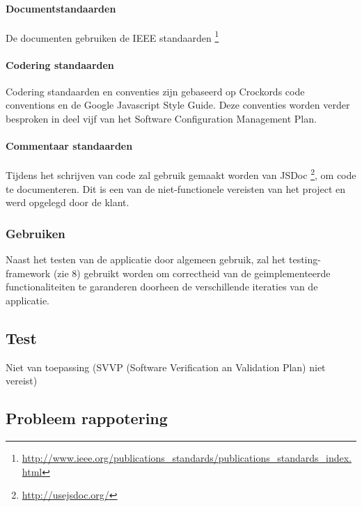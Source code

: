 \paragraph {Documentstandaarden}
De documenten gebruiken de IEEE standaarden \footnote{\url{http://www.ieee.org/publications_standards/publications_standards_index.html}}

\paragraph{Codering standaarden}

Codering standaarden en conventies zijn gebaseerd op Crockords code conventions en de Google Javascript Style Guide. Deze conventies worden verder besproken in deel vijf van het Software Configuration Management Plan.

\paragraph{Commentaar standaarden}

Tijdens het schrijven van code zal gebruik gemaakt worden van JSDoc \footnote{\url{http://usejsdoc.org/}}, om code te documenteren. Dit is een van de niet-functionele vereisten van het project en werd opgelegd door de klant.

\subsubsection{Gebruiken}

Naast het testen van de applicatie door algemeen gebruik, zal het testing-framework (zie 8) gebruikt worden om correctheid van de geimplementeerde functionaliteiten te garanderen doorheen de verschillende iteraties van de applicatie.


\subsection{Test}
Niet van toepassing (SVVP (Software Verification an Validation Plan) niet vereist)

\subsection{Probleem rappotering}

